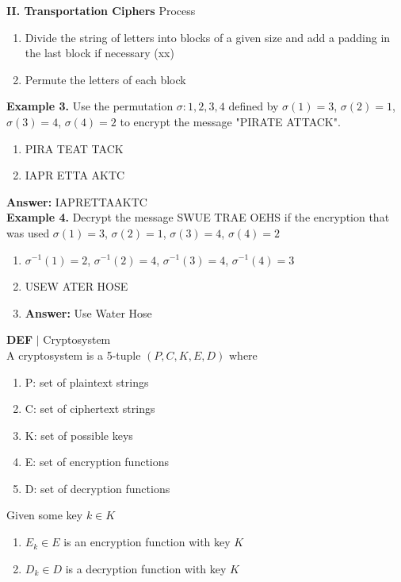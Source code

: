 \documentclass [12pt]{article}
\begin{document}
\noindent\textbf{II. Transportation Ciphers}
Process
\begin{enumerate}[1.]
    \item Divide the string of letters into blocks of a given size and add a padding in the last block if necessary (xx)
    \item Permute the letters of each block
\end{enumerate}
\noindent\textbf{Example 3.} Use the permutation $\sigma:{1,2,3,4}$ defined by $\sigma(1)=3$, $\sigma(2)=1$, $\sigma(3)=4$, $\sigma(4)=2$ to encrypt the message "PIRATE ATTACK".
\begin{enumerate}[\quad1.]
    \item PIRA TEAT TACK
    \item IAPR ETTA AKTC
\end{enumerate}
\quad\textbf{Answer: }IAPRETTAAKTC
\vspace{0.2in}
\\
\noindent\textbf{Example 4.} Decrypt the message SWUE TRAE OEHS if the encryption that was used $\sigma(1)=3$, $\sigma(2)=1$, $\sigma(3)=4$, $\sigma(4)=2$
\begin{enumerate}[\quad]
    \item $\sigma^{-1}(1)=2$, $\sigma^{-1}(2)=4$, $\sigma^{-1}(3)=4$, $\sigma^{-1}(4)=3$
    \item USEW ATER HOSE
    \item\textbf{Answer:} Use Water Hose
\end{enumerate}
\begin{framed}
\noindent\textbf{DEF} $|$ Cryptosystem\\
A cryptosystem is a 5-tuple $(P,C,K,E,D)$ where
\begin{enumerate}[\quad]
    \item P: set of plaintext strings
    \item C: set of ciphertext strings
    \item K: set of possible keys
    \item E: set of encryption functions
    \item D: set of decryption functions
\end{enumerate}
Given some key $k \in K$
\begin{enumerate}[$\cdot$]
    \item $E_k\in E$ is an encryption function with key $K$
    \item $D_k\in D$ is a decryption function with key $K$
\end{enumerate}
\end{framed}
\end{document}

